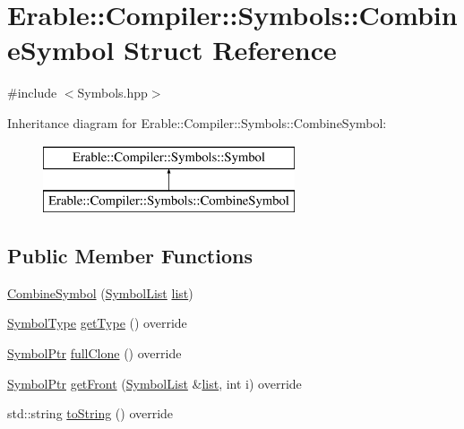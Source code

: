 \hypertarget{struct_erable_1_1_compiler_1_1_symbols_1_1_combine_symbol}{}\section{Erable\+::Compiler\+::Symbols\+::Combine\+Symbol Struct Reference}
\label{struct_erable_1_1_compiler_1_1_symbols_1_1_combine_symbol}


{\ttfamily \#include $<$Symbols.\+hpp$>$}

Inheritance diagram for Erable\+::Compiler\+::Symbols\+::Combine\+Symbol\+:\begin{figure}[H]
\begin{center}
\leavevmode
\includegraphics[height=2.000000cm]{struct_erable_1_1_compiler_1_1_symbols_1_1_combine_symbol}
\end{center}
\end{figure}
\subsection*{Public Member Functions}
\begin{DoxyCompactItemize}
\item 
\mbox{\hyperlink{struct_erable_1_1_compiler_1_1_symbols_1_1_combine_symbol_a8272aef11b5c378ba34f3ee54836a354}{Combine\+Symbol}} (\mbox{\hyperlink{namespace_erable_1_1_compiler_1_1_symbols_a63e8157d2f729d4689d27bacad42f8ed}{Symbol\+List}} \mbox{\hyperlink{struct_erable_1_1_compiler_1_1_symbols_1_1_combine_symbol_a5bacd166436d523d163b11fb0d343b2e}{list}})
\item 
\mbox{\hyperlink{namespace_erable_1_1_compiler_1_1_symbols_a3b60ec10cda0920ec4368128361b8320}{Symbol\+Type}} \mbox{\hyperlink{struct_erable_1_1_compiler_1_1_symbols_1_1_combine_symbol_a416d89f88e2708deeaee33425849ae4a}{get\+Type}} () override
\item 
\mbox{\hyperlink{namespace_erable_1_1_compiler_1_1_symbols_a8f0bc762f448ea4d84e8713ab3e140b9}{Symbol\+Ptr}} \mbox{\hyperlink{struct_erable_1_1_compiler_1_1_symbols_1_1_combine_symbol_ac20bc8743057e8668bb3871b24dd180d}{full\+Clone}} () override
\item 
\mbox{\hyperlink{namespace_erable_1_1_compiler_1_1_symbols_a8f0bc762f448ea4d84e8713ab3e140b9}{Symbol\+Ptr}} \mbox{\hyperlink{struct_erable_1_1_compiler_1_1_symbols_1_1_combine_symbol_a38911131d702965f629c2b30c60f3aea}{get\+Front}} (\mbox{\hyperlink{namespace_erable_1_1_compiler_1_1_symbols_a63e8157d2f729d4689d27bacad42f8ed}{Symbol\+List}} \&\mbox{\hyperlink{struct_erable_1_1_compiler_1_1_symbols_1_1_combine_symbol_a5bacd166436d523d163b11fb0d343b2e}{list}}, int i) override
\item 
std\+::string \mbox{\hyperlink{struct_erable_1_1_compiler_1_1_symbols_1_1_combine_symbol_aedd44bc23607d42bdb45a35aba3dd184}{to\+String}} () override
\end{DoxyCompactItemize}

